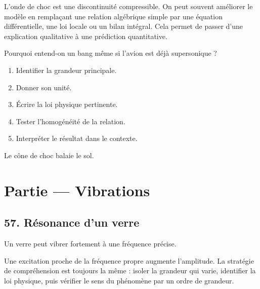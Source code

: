 \documentclass[11pt,a4paper]{article}
\begin{document}
\begin{approfondissementbox}
L'onde de choc est une discontinuité compressible.
On peut souvent améliorer le modèle en remplaçant une relation algébrique simple par une équation différentielle, une loi locale ou un bilan intégral. Cela permet de passer d'une explication qualitative à une prédiction quantitative.
\end{approfondissementbox}

\begin{exercicebox}
Pourquoi entend-on un bang même si l'avion est déjà supersonique ?
\begin{enumerate}
  \item Identifier la grandeur principale.
  \item Donner son unité.
  \item Écrire la loi physique pertinente.
  \item Tester l'homogénéité de la relation.
  \item Interpréter le résultat dans le contexte.
\end{enumerate}
\end{exercicebox}

\begin{corrigebox}[Indication]
Le cône de choc balaie le sol.
\end{corrigebox}


\section{Partie — Vibrations}


\subsection{57. Résonance d'un verre}

\begin{exemplebox}
Un verre peut vibrer fortement à une fréquence précise.
\end{exemplebox}

\begin{methodebox}
Une excitation proche de la fréquence propre augmente l'amplitude.
La stratégie de compréhension est toujours la même : isoler la grandeur qui varie, identifier la loi physique, puis vérifier le sens du phénomène par un ordre de grandeur.
\end{methodebox}
\end{document}
